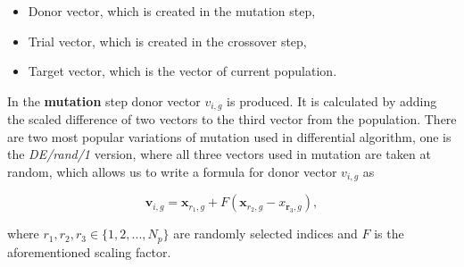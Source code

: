 \documentclass[12pt,a4paper,openany]{book}
\begin{document}
\begin{itemize}
\item Donor vector, which is created in the mutation step,
\item Trial vector, which is created in the crossover step,
\item Target vector, which is the vector of current population.
\end{itemize}


In the \textbf{mutation} step donor vector $v_{i, g}$ is produced. It is calculated by adding the scaled difference of two vectors to the third vector from the population. There are two most popular variations of mutation used in differential algorithm, one is the \textit{DE/rand/1} version, where all three vectors used in mutation are taken at random, which allows us to write a formula for donor vector  $v_{i, g}$ as

\begin{equation}
\mathbf{v}_{i, g}=\mathbf{x}_{r_{1}, g}+F\left(\mathbf{x}_{r_{2}, g}-x_{\mathbf{r}_{3}, g}\right),
\end{equation}

\noindent where $r_{1}, r_{2},r_{3} \in \{1, 2, ..., N_{p}\}$ are randomly selected indices and $F$ is the aforementioned scaling factor.
\end{document}
